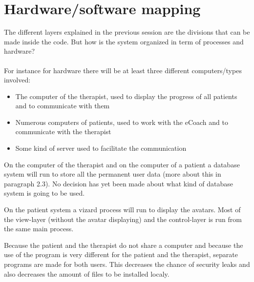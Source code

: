 \section{Hardware/software mapping}
\label{sec:hardsoftmap}

The different layers explained in the previous session are the divisions that can be made inside the code. But how is the system organized in term of processes and hardware? 
\paragraph{}
For instance for hardware there will be at least three different computers/types involved: 
\begin{itemize}
\item The computer of the therapist, used to display the progress of all patients and to communicate with them
\item Numerous computers of patients, used to work with the eCoach and to communicate with the therapist
\item Some kind of server used to facilitate the communication
\end{itemize}

On the computer of the therapist and on the computer of a patient a database system will run to store all the permanent user data (more about this in paragraph 2.3).  No decision has yet been made about what kind of database system is going to be used.

On the patient system a vizard process will run to display the avatars. Most of the view-layer (without the avatar displaying) and the control-layer is run from the same main process. 

Because the patient and the therapist do not share a computer and because the use of the program is very different for the patient and the therapist, separate programs are made for both users. This decreases the chance of security leaks and also decreases the amount of files to be installed localy.

